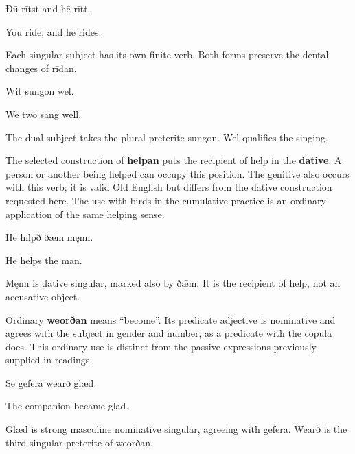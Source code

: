Ðū rītst and hē rītt.

You ride, and he rides.

Each singular subject has its own finite verb. Both forms preserve the dental changes of rīdan.

Wit sungon wel.

We two sang well.

The dual subject takes the plural preterite sungon. Wel qualifies the singing.

The selected construction of \textbf{helpan} puts the recipient of help in the \textbf{dative}. A person or another being helped can occupy this position. The genitive also occurs with this verb; it is valid Old English but differs from the dative construction requested here. The use with birds in the cumulative practice is an ordinary application of the same helping sense.

Hē hilpð ðǣm męnn.

He helps the man.

Męnn is dative singular, marked also by ðǣm. It is the recipient of help, not an accusative object.

Ordinary \textbf{weorðan} means “become”. Its predicate adjective is nominative and agrees with the subject in gender and number, as a predicate with the copula does. This ordinary use is distinct from the passive expressions previously supplied in readings.

Se gefēra wearð glæd.

The companion became glad.

Glæd is strong masculine nominative singular, agreeing with gefēra. Wearð is the third singular preterite of weorðan.

